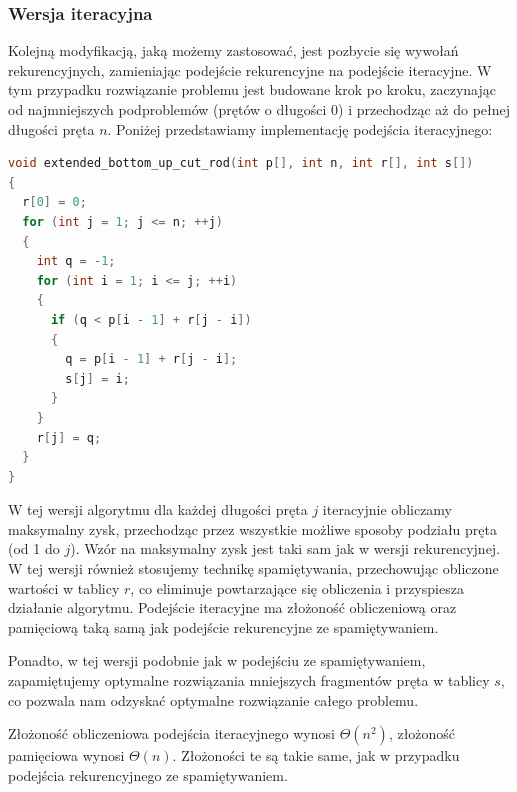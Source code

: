 \documentclass{article}
\begin{document}
\subsubsection{Wersja iteracyjna}
Kolejną modyfikacją, jaką możemy zastosować, jest pozbycie się wywołań rekurencyjnych, zamieniając podejście rekurencyjne na podejście iteracyjne. W tym przypadku rozwiązanie problemu jest budowane krok po kroku, zaczynając od najmniejszych podproblemów (prętów o długości 0) i przechodząc aż do pełnej długości pręta $n$.
Poniżej przedstawiamy implementację podejścia iteracyjnego:
\begin{lstlisting}[style=mystyle, language=C++, caption={Implementacja \texttt{iterative\_cut\_rod}}, label={lst:iterative_cut_rod}]
void extended_bottom_up_cut_rod(int p[], int n, int r[], int s[])
{
  r[0] = 0;
  for (int j = 1; j <= n; ++j)
  {
    int q = -1;
    for (int i = 1; i <= j; ++i)
    {
      if (q < p[i - 1] + r[j - i])
      {
        q = p[i - 1] + r[j - i];
        s[j] = i;
      }
    }
    r[j] = q;
  }
}
\end{lstlisting}
W tej wersji algorytmu dla każdej długości pręta $j$ iteracyjnie obliczamy maksymalny zysk, przechodząc przez wszystkie możliwe sposoby podziału pręta (od 1 do $j$). Wzór na maksymalny zysk jest taki sam jak w wersji rekurencyjnej. W tej wersji również stosujemy technikę spamiętywania, przechowując obliczone wartości w tablicy $r$, co eliminuje powtarzające się obliczenia i przyspiesza działanie algorytmu.
Podejście iteracyjne ma złożoność obliczeniową oraz pamięciową taką samą jak podejście rekurencyjne ze spamiętywaniem.

Ponadto, w tej wersji podobnie jak w podejściu ze spamiętywaniem, zapamiętujemy optymalne rozwiązania mniejszych fragmentów pręta w tablicy $s$, co pozwala nam odzyskać optymalne rozwiązanie całego problemu.

Złożoność obliczeniowa podejścia iteracyjnego wynosi $\Theta(n^2)$, złożoność pamięciowa wynosi $\Theta(n)$. Złożoności te są takie same, jak w przypadku podejścia rekurencyjnego ze spamiętywaniem.
\end{document}
